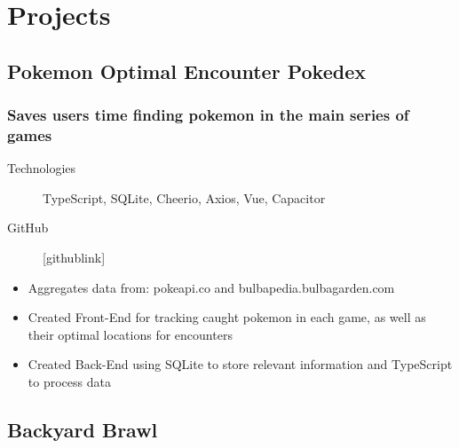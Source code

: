 \documentclass[10pt]{article} %
\begin{document}
\section{Projects}
\subsection{Pokemon Optimal Encounter Pokedex}
\subsubsection{Saves users time finding pokemon in the main series of games}
\begin{description}
    \item[Technologies] {TypeScript, SQLite, Cheerio, Axios, Vue, Capacitor}
    \item[GitHub] {[githublink]} 
\end{description}
\begin{itemize}
    \item {Aggregates data from: pokeapi.co and bulbapedia.bulbagarden.com}
    \item {Created Front-End for tracking caught pokemon in each game, 
        as well as their optimal locations for encounters}
    \item {Created Back-End using SQLite to store relevant information and TypeScript
        to process data}
\end{itemize}

\subsection{Backyard Brawl}
\end{document}
